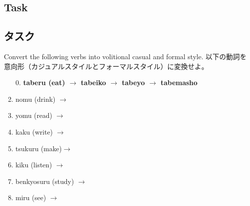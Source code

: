 \documentclass[uplatex,dvipdfmx,b5paper,english,10pt]{jsbook}
\begin{document}
\ifEnglish
\subsection{Task}
\else
\subsection{タスク}
\fi

\begin{toiquestion}
\ifEnglish
Convert the following verbs into volitional casual and formal style.
\else
以下の動詞を意向形（カジュアルスタイルとフォーマルスタイル）に変換せよ。
\fi
\end{toiquestion}

\begin{enumerate}
 \item[0.] {\bfseries taberu (eat) $\rightarrow$ tabeiko $\rightarrow$ tabeyo $\rightarrow$ tabemasho}
 \item nomu (drink)  $\rightarrow$ \hrulefill
 \item yomu (read)   $\rightarrow$ \hrulefill
 \item kaku (write)  $\rightarrow$ \hrulefill
 \item tsukuru (make)$\rightarrow$ \hrulefill
 \item kiku (listen) $\rightarrow$ \hrulefill
 \item benkyosuru (study) $\rightarrow$ \hrulefill
 \item miru (see)    $\rightarrow$ \hrulefill
\end{enumerate}
\end{document}
